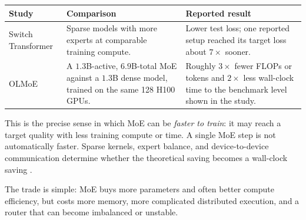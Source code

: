 \documentclass[11pt]{article}
\begin{document}
\begin{center}
\small
\begin{tabularx}{\textwidth}{@{}l X X@{}}
\toprule
Study & Comparison & Reported result \\
\midrule
Switch Transformer \citep{fedus2022switch}
  & Sparse models with more experts at comparable training compute.
  & Lower test loss; one reported setup reached its target loss about $7\times$
    sooner. \\
OLMoE \citep{muennighoff2024olmoe}
  & A $1.3$B-active, $6.9$B-total MoE against a $1.3$B dense model, trained on
    the same 128 H100 GPUs.
  & Roughly $3\times$ fewer FLOPs or tokens and $2\times$ less wall-clock time
    to the benchmark level shown in the study. \\
\bottomrule
\end{tabularx}
\end{center}

This is the precise sense in which MoE can be \emph{faster to train}: it may
reach a target quality with less training compute or time.  A single MoE step is
not automatically faster.  Sparse kernels, expert balance, and device-to-device
communication determine whether the theoretical saving becomes a wall-clock
saving \citep{hashimoto2026attentionmoe}.

The trade is simple: MoE buys more parameters and often better compute
efficiency, but costs more memory, more complicated distributed execution, and
a router that can become imbalanced or unstable.
\end{document}
